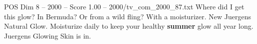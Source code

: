 \begin{textsample}{POS Dim 8 – 2000 – Score 1.00 – 2000/tv\_com\_2000\_87.txt}  \label{ex:f8_pos_038}
Where did I get this glow?
In Bermuda?
Or from a wild fling?
With a moisturizer.
New Juergens Natural Glow.
Moisturize daily to keep your healthy \textbf{summer} glow all year long.
Juergens Glowing Skin is in.

\end{textsample}
